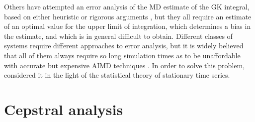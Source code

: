 Others have attempted an error analysis of the MD estimate of the GK integral, based on either heuristic or rigorous arguments \citep{Jones2012,Wang_gk2017,Oliveira2017}, but they all require an estimate of an optimal value for the upper limit of integration, which determines a bias in the estimate, and which is in general difficult to obtain. Different classes of systems require different approaches to error analysis, but it is widely believed that all of them always require so long simulation times as to be unaffordable with accurate but expensive AIMD techniques \citep{Carbogno:2017gc}. In order to solve this problem, \cite{Ercole2017} considered it in the light of the statistical theory of stationary time series.



\section{Cepstral analysis}  \label{sec:cepstral-analysis}

